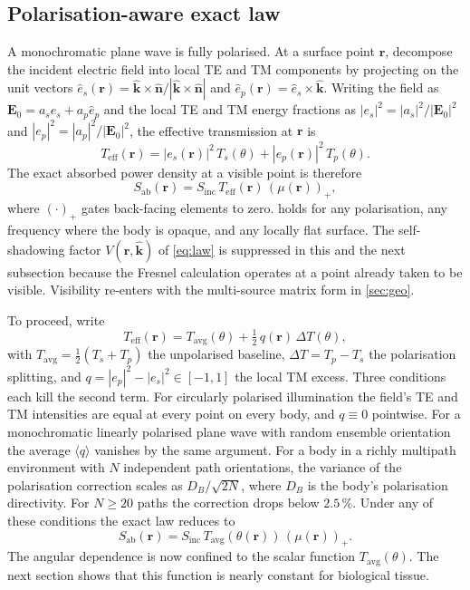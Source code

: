 \documentclass[journal,twocolumn,10pt]{IEEEtran}
\theoremstyle{plain}
\theoremstyle{remark}
\newcommand{\khat}{\hat{\bm{k}}}
\newcommand{\nhat}{\hat{\bm{n}}}
\newcommand{\rr}{\mathbf{r}}
\newcommand{\EE}{\mathbf{E}}
\newcommand{\Sinc}{S_{\mathrm{inc}}}
\newcommand{\Sab}{S_{\mathrm{ab}}}
\newcommand{\Teff}{T_{\mathrm{eff}}}
\newcommand{\Tavg}{T_{\mathrm{avg}}}
\newcommand{\pospart}[1]{\left(#1\right)_{+}}
\newcommand{\Vis}{V}
\begin{document}
\subsection{Polarisation-aware exact law}\label{subsec:exact-law}
A monochromatic plane wave is fully polarised. At a surface point
$\rr$, decompose the incident electric field into local TE and TM
components by projecting on the unit vectors
$\hat{e}_s(\rr) = \khat \times \nhat / |\khat \times \nhat|$ and
$\hat{e}_p(\rr) = \hat{e}_s \times \khat$. Writing the field as
$\EE_0 = a_s \hat{e}_s + a_p \hat{e}_p$ and the local TE and TM
energy fractions as $|e_s|^2 = |a_s|^2 / |\EE_0|^2$ and
$|e_p|^2 = |a_p|^2 / |\EE_0|^2$, the effective transmission at $\rr$
is
\begin{equation}\label{eq:Teff}
  \Teff(\rr) = |e_s(\rr)|^2 \, T_s(\theta) + |e_p(\rr)|^2 \,
  T_p(\theta).
\end{equation}
The exact absorbed power density at a visible point is therefore
\begin{equation}\label{eq:Sab-exact}
  \boxed{
  \Sab(\rr) = \Sinc \, \Teff(\rr) \, \pospart{\mu(\rr)},
  }
\end{equation}
where $(\cdot)_+$ gates back-facing elements to zero. 
holds for any polarisation, any frequency where the body is opaque,
and any locally flat surface. The self-shadowing factor $\Vis(\rr,\khat)$
of \eqref{eq:law} is suppressed in this and the next subsection because
the Fresnel calculation operates at a point already taken to be
visible. Visibility re-enters with the multi-source matrix form in
\cref{sec:geo}.

To proceed, write
\begin{equation}\label{eq:Teff-decomp}
  \Teff(\rr) = \Tavg(\theta) + \tfrac{1}{2}\,q(\rr)\,\Delta T(\theta),
\end{equation}
with $\Tavg = \tfrac{1}{2}(T_s + T_p)$ the unpolarised baseline,
$\Delta T = T_p - T_s$ the polarisation splitting, and $q = |e_p|^2
- |e_s|^2 \in [-1, 1]$ the local TM excess. Three conditions each
kill the second term. For circularly polarised illumination the
field's TE and TM intensities are equal at every point on every
body, and $q \equiv 0$ pointwise. For a monochromatic linearly
polarised plane wave with random ensemble orientation the average
$\langle q \rangle$ vanishes by the same argument. For a body in a
richly multipath environment with $N$ independent path orientations,
the variance of the polarisation correction scales as
$D_B / \sqrt{2N}$, where $D_B$ is the body's polarisation directivity.
For $N \ge 20$ paths the correction drops below $2.5\,\%$. Under any
of these conditions the exact law reduces to
\begin{equation}\label{eq:Sab-Tavg}
  \Sab(\rr) = \Sinc \, \Tavg(\theta(\rr)) \, \pospart{\mu(\rr)}.
\end{equation}
The angular dependence is now confined to the scalar function
$\Tavg(\theta)$. The next section shows that this function is nearly
constant for biological tissue.
\end{document}
